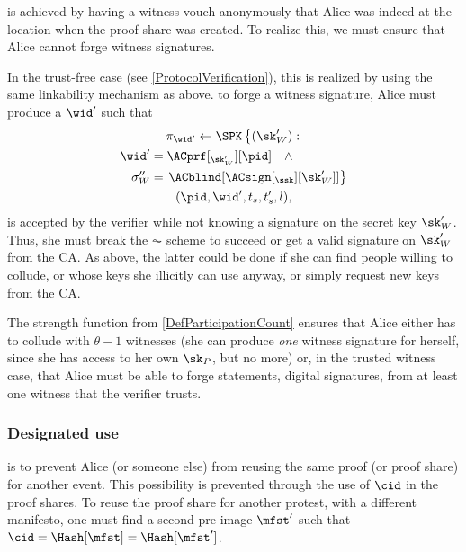  is achieved by having a witness vouch anonymously that Alice was indeed at the location when the proof share was created.
To realize this, we must ensure that Alice cannot forge witness signatures.

In the trust-free case (see \cref{ProtocolVerification}), this is realized by 
using the same linkability mechanism as above.
\Ie to forge a witness signature, Alice must produce a \(\wid'\) such that
\begin{multline*}
  \pi_{\wid'}\gets \SPK\left\{ (\sk_W') : \right. \\
    \begin{aligned}
      \wid' &= \ACprf[_{\sk_W'}][\pid] \quad \land \\
      \sigma_W'' &= \left. \ACblind[\ACsign[_{\ssk}][\sk_W']] \right\}
    \end{aligned} \\
      (\pid, \wid', t_s, t_s', l),
\end{multline*}
is accepted by the verifier while not knowing a signature on the secret key 
\(\sk_W'\).
Thus, she must break the \(\AC\) scheme to succeed or get a valid signature on \(\sk_W'\) from the \ac{CA}.
As above, the latter could be done if she can find people willing to collude, 
or whose keys she illicitly can use anyway, or 
simply request new keys from the \ac{CA}.


The strength function from \cref{DefParticipationCount} ensures that
Alice either has to collude with \(\theta - 1\) witnesses (she can
produce \emph{one} witness signature for herself, since she has access
to her own \(\sk_P\), but no more) or, in the trusted witness case,
that Alice must be able to forge statements, \eg digital signatures,
from at least one witness that the verifier trusts.

\subsubsection{Designated use}%
\label{analysis-designated}

 is to prevent Alice (or someone else) from reusing the same proof (or proof share) for another event.
This possibility is prevented through the use of \(\cid\) in the proof shares.
To reuse the proof share for another protest, with a different manifesto, one 
must find a second pre-image \(\mfst'\) such that \(\cid = \Hash[\mfst] = 
  \Hash[\mfst']\).

